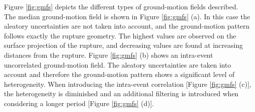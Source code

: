 Figure \ref{fig:gmfs} depicts the different types of ground-motion 
fields described. The median ground-motion field is shown in Figure 
\ref{fig:gmfs} (a). 
%
In this case the aleatory uncertainties are not taken into account, 
and the ground-motion pattern follows exactly the rupture geometry. 
The highest values are observed on the surface projection of the rupture, and 
decreasing values are found at increasing distances from the rupture. 
%
Figure \ref{fig:gmfs} (b) shows an intra-event uncorrelated ground-motion 
field. The aleatory uncertainties are taken into account and therefore the
ground-motion pattern shows a significant level of heterogeneity. 
%
When introducing the intra-event correlation [Figure \ref{fig:gmfs} (c)], 
the heterogeneity is diminished and an additional filtering is introduced 
when considering a longer period [Figure \ref{fig:gmfs} (d)].
%
